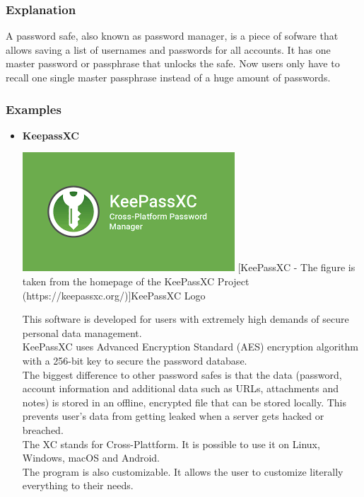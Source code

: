 \documentclass[conference]{IEEEtran}
\begin{document}
\subsubsection{Explanation}

A password safe, also known as password manager, is a piece of sofware that allows saving a list of usernames and passwords for all accounts. It has one master password or passphrase that unlocks the safe. Now users only have to recall one single master passphrase instead of a huge amount of passwords.


\subsubsection{Examples}

\begin{itemize}
    \item \textbf{KeepassXC} \\
        \begin{center}
            \includegraphics[scale=0.6]{./images/KeePass.png}
            [KeePassXC - The figure is taken from the homepage of the KeePassXC Project (https://keepassxc.org/)]{KeePassXC Logo}
        \end{center}

        This software is developed for users with extremely high demands of secure personal data management. \\
        KeePassXC uses Advanced Encryption Standard (AES) encryption algorithm with a 256-bit key to secure the password database.\\
        The biggest difference to other password safes is that the data (password, account information and additional data such as URLs, attachments and notes) is stored in an offline, encrypted file that can be stored locally. This  prevents user's data from getting leaked when a server gets hacked or breached.\\
        The XC stands for Cross-Plattform. It is possible to use it on Linux, Windows, macOS and Android.\\
        The program is also customizable. It allows the user to customize literally everything to their needs.\cite{b6}\\



\end{itemize}
\end{document}
